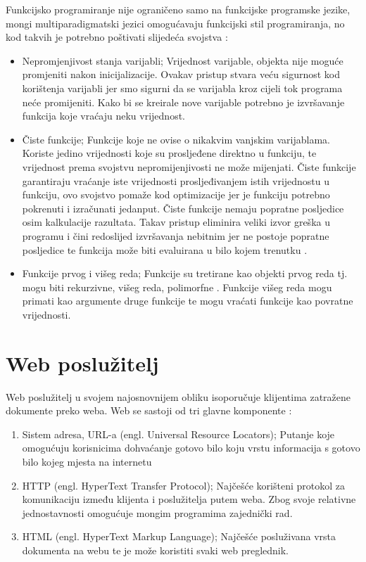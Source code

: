 \documentclass[]{foi} %
\begin{document}
Funkcijsko programiranje nije ograničeno samo na funkcijske programske jezike,
mongi multiparadigmatski jezici omogućavaju funkcijski stil programiranja, no kod takvih je
potrebno poštivati slijedeća svojstva \cite{rovzic2016lambda}:
\begin{itemize}
	\item Nepromjenjivost stanja varijabli; Vrijednost varijable, objekta nije moguće promjeniti
	      nakon inicijalizacije. Ovakav pristup stvara veću sigurnost kod korištenja varijabli jer
	      smo sigurni da se varijabla kroz cijeli tok programa neće promijeniti. Kako bi se kreirale
	      nove varijable potrebno je izvršavanje funkcija koje vraćaju neku vrijednost.
	\item Čiste funkcije; Funkcije koje ne ovise o nikakvim vanjskim varijablama. Koriste jedino vrijednosti
	      koje su prosljeđene direktno u funkciju, te vrijednost prema svojstvu nepromijenjivosti ne može mijenjati.
	      Čiste funkcije garantiraju vraćanje iste vrijednosti prosljeđivanjem istih vrijednostu u funkciju,
	      ovo svojstvo pomaže kod optimizacije jer je funkciju potrebno pokrenuti i izračunati jedanput.
	      Čiste funkcije nemaju popratne posljedice osim kalkulacije razultata. Takav pristup eliminira
	      veliki izvor greška u programu i čini redoslijed izvršavanja nebitnim jer ne postoje popratne
	      posljedice te funkcija može biti evaluirana u bilo kojem trenutku \cite{hughes1989functional}.
	\item Funkcije prvog i višeg reda; Funkcije su tretirane kao objekti prvog reda tj. mogu biti rekurzivne,
	      višeg reda, polimorfne \cite{10.1145/72551.72554}. Funkcije višeg reda mogu primati kao argumente
	      druge funkcije te mogu vraćati funkcije kao povratne vrijednosti.
\end{itemize}

\chapter{Web poslužitelj}

Web poslužitelj u svojem najosnovnijem obliku isoporučuje klijentima zatražene dokumente preko weba.
Web se sastoji od tri glavne komponente \cite{yeager1996web}:
\begin{enumerate}
	\item Sistem adresa, URL-a (engl. Universal Resource Locators); Putanje koje omogućuju korisnicima
	      dohvaćanje gotovo bilo koju vrstu informacija s gotovo bilo kojeg mjesta na internetu
	\item HTTP (engl. HyperText Transfer Protocol); Najčešće korišteni protokol za komunikaciju između
	      klijenta i poslužitelja putem weba. Zbog svoje relativne jednostavnosti omogućuje mongim programima
	      zajednički rad.
	\item HTML (engl. HyperText Markup Language); Najčešće posluživana vrsta dokumenta na webu te je može
	      koristiti svaki web preglednik.
\end{enumerate}
\end{document}
